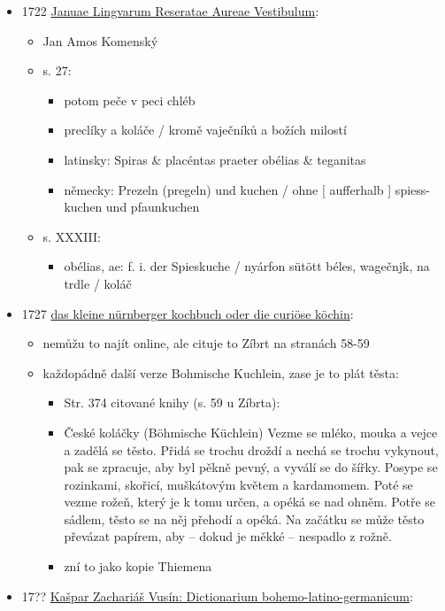 \begin{itemize}
\tightlist
\item
  1722
  \href{https://ceskadigitalniknihovna.cz/uuid/uuid:53e484e8-3646-4b98-a954-6abfe5313ce0}{Januae
  Lingvarum Reseratae Aureae Vestibulum}:

  \begin{itemize}
  \tightlist
  \item
    Jan Amos Komenský
  \item
    s. 27:

    \begin{itemize}
    \tightlist
    \item
      potom peče v peci chléb
    \item
      preclíky a koláče / kromě vaječníků a božích milostí
    \item
      latinsky: Spiras \& placéntas praeter obélias \& teganitas
    \item
      německy: Prezeln (pregeln) und kuchen / ohne {[} aufferhalb {]}
      spiess-kuchen und pfaunkuchen
    \end{itemize}
  \item
    s. XXXIII:

    \begin{itemize}
    \tightlist
    \item
      obélias, ae: f. i. der Spieskuche / nyárfon sütött béles,
      wagečnjk, na trdle / koláč
    \end{itemize}
  \end{itemize}
\item
  1727
  \href{https://ndk.cz/uuid/uuid:b59a1ff0-9f23-11ea-b6e0-005056827e51}{das
  kleine nürnberger kochbuch oder die curiöse köchin}:

  \begin{itemize}
  \tightlist
  \item
    nemůžu to najít online, ale cituje to Zíbrt na stranách 58-59
  \item
    každopádně další verze Bohmische Kuchlein, zase je to plát těsta:

    \begin{itemize}
    \tightlist
    \item
      Str. 374 citované knihy (s. 59 u Zíbrta):
    \item
      České koláčky (Böhmische Küchlein) Vezme se mléko, mouka a vejce a
      zadělá se těsto. Přidá se trochu droždí a nechá se trochu
      vykynout, pak se zpracuje, aby byl pěkně pevný, a vyválí se do
      šířky. Posype se rozinkami, skořicí, muškátovým květem a
      kardamomem. Poté se vezme rožeň, který je k tomu určen, a opéká se
      nad ohněm. Potře se sádlem, těsto se na něj přehodí a opéká. Na
      začátku se může těsto převázat papírem, aby -- dokud je měkké --
      nespadlo z rožně.
    \item
      zní to jako kopie Thiemena
    \end{itemize}
  \end{itemize}
\item
  17??
  \href{https://bara.ujc.cas.cz/slovniky/VusSlovBLG1729/vusin22.html\#CTX14944}{Kašpar
  Zachariáš Vusín: Dictionarium bohemo-latino-germanicum}:


\end{itemize}
